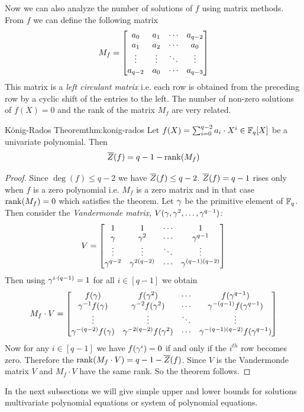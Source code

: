Now we can also analyze the number of solutions of $f$ using matrix methods. From $f$ we can define the following matrix $$M_f=\left[\begin{matrix}a_0 & a_1 & \cdots & a_{q-2}\\ a_1 & a_2 & \cdots & a_0\\ \vdots & \vdots & \ddots & \vdots\\ a_{q-2} & a_0 & \cdots & a_{q-3}\end{matrix}\right]$$This matrix is a \emph{left circulant matrix} i.e. each row is obtained from the preceding row by a cyclic shift of the entries to the left. The number of non-zero solutions of $f(X)=0$ and the rank of the matrix $M_f$ are very related.
\begin{Theorem}{K\"{o}nig-Rados Theorem}{thm:konig-rados}
  Let $f(X)=\sum_{i=0}^{q-2}a_i\cdot X^i\in\mathbb{F}_q[X]$ be a univariate polynomial. Then $$\overline{Z}(f)=q-1-\operatorname{rank}(M_f)$$
\end{Theorem}
\begin{proof}
  Since $\deg(f)\leq q-2$ we have $\overline{Z}(f)\leq q-2$. $\overline{Z}(f)=q-1$ rises only when $f$ is a zero polynomial i.e. $M_f$ is a zero matrix and in that case $\operatorname{rank}(M_f)=0$ which satisfies the theorem. Let $\gamma$ be the primitive element of $\mathbb{F}_q$. Then consider the \emph{Vandermonde matrix}, $V(\gamma,\gamma^2,\dots, \gamma^{q-1})$: $$V=\left[\begin{matrix}1&1&\cdots&1\\ \gamma & \gamma^2 &\cdots & \gamma^{q-1}\\ \vdots & \vdots & \ddots & \vdots\\ \gamma^{q-2} & \gamma^{2 (q-2)} & \cdots &\gamma^{(q-1)(q-2)}\end{matrix}\right]$$Then using $\gamma^{i\cdot (q-1)}=1$ for all $i\in[q-1]$ we obtain $$M_f\cdot V=\left[\begin{matrix}f(\gamma) & f(\gamma^2) & \cdots & f(\gamma^{q-1})\\ \gamma^{-1}f(\gamma) & \gamma^{-2} f(\gamma^2) & \cdots & \gamma^{-(q-1)}f(\gamma^{q-1})\\ \vdots & \vdots & \ddots & \vdots \\ \gamma^{-(q-2)}f(\gamma) & \gamma^{-2(q-2)}f(\gamma^2) & \cdots & \gamma^{-(q-1)(q-2)}f(\gamma^{q-1})\end{matrix}\right]$$Now for any $i\in[q-1]$ we have $f(\gamma^i)=0$ if and only if  the $i^{th}$ row becomes zero. Therefore the $\operatorname{rank}(M_f\cdot V)=q-1-\overline{Z}(f)$. Since $V$ is the Vandermonde matrix $V$ and $M_f\cdot V$ have the same rank. So the theorem follows. 
\end{proof}

In the next subsections we will give simple upper and lower bounds for solutions multivariate polynomial equations or system of polynomial equations. 
